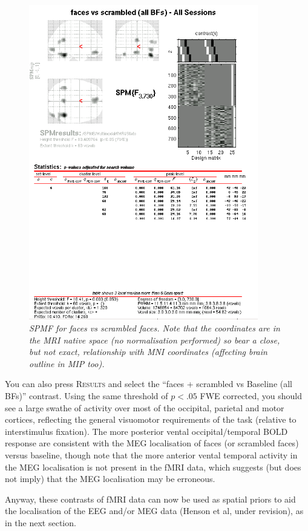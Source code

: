\begin{figure}
\begin{center}
\includegraphics[width=100mm]{multimodal/figures/fmri_faces_vs_scrambled}
\caption{\em  SPM{F} for faces vs scrambled faces. Note that the coordinates are in the MRI native space (no normalisation performed) so bear a close, but not exact, relationship with MNI coordinates (affecting brain outline in MIP too).\label{multimodal:fig:22}}
\end{center}
\end{figure}

You can also press \textsc{Results} and select the ``faces + scrambled vs Baseline (all BFs)'' contrast. Using the same threshold of $p<.05$ FWE corrected, you should see a large swathe of activity over most of the occipital, parietal and motor cortices, reflecting the general visuomotor requirements of the task (relative to interstimulus fixation). The more posterior vental occipital/temporal BOLD response are consistent with the MEG localisation of faces (or scrambled faces) versus baseline, though note that the more anterior vental temporal activity in the MEG localisation is not present in the fMRI data, which suggests (but does not imply) that the MEG localisation may be erroneous.

Anyway, these contrasts of fMRI data can now be used as spatial priors to aid the localisation of the EEG and/or MEG data (Henson et al, under revision), as in the next section.

